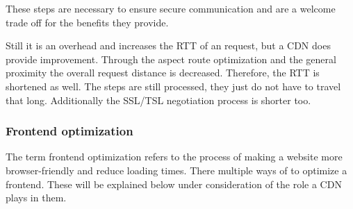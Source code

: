 These steps are necessary to ensure secure communication and are a welcome trade off for the benefits they provide. 

Still it is an overhead and increases the RTT of an request, but a CDN does provide improvement. Through the aspect route optimization and the general proximity the overall request distance is decreased. Therefore, the RTT is shortened as well. The steps are still processed, they just do not have to travel that long. Additionally the SSL/TSL negotiation process is shorter too. \cite{cdn_ssl_tsl}

\subsubsection{Frontend optimization}

The term frontend optimization refers to the process of making a website more browser-friendly and reduce loading times. There multiple ways of to optimize a frontend. These will be explained below under consideration of the role a CDN plays in them.

